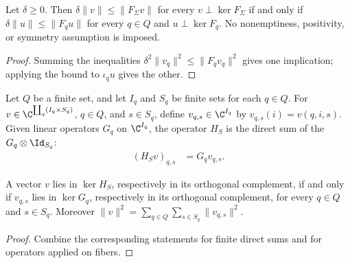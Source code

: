 \begin{lemma}
    \label{thm:mpo_sigma_fiber_gap_iff}
    \leanok
    Let $\delta\geq0$. Then $\delta\|v\|\leq\|F_\Sigma v\|$ for every
    $v\perp\ker F_\Sigma$ if and only if $\delta\|u\|\leq\|F_qu\|$ for every
    $q\in Q$ and $u\perp\ker F_q$. No nonemptiness, positivity, or symmetry
    assumption is imposed.
\end{lemma}
\begin{proof}
    \leanok
    Summing the inequalities $\delta^2\|v_q\|^2\leq\|F_qv_q\|^2$ gives one
    implication; applying the bound to $\iota_qu$ gives the other.
\end{proof}

\begin{definition}
    \label{def:mpo_dependent_spectator_operator}
    \leanok
    Let $Q$ be a finite set, and let $I_q$ and $S_q$ be finite sets for each
    $q\in Q$. For $v\in\C^{\coprod_q(I_q\times S_q)}$, $q\in Q$, and $s\in S_q$,
    define $v_{q,s}\in\C^{I_q}$ by $v_{q,s}(i)=v(q,i,s)$. Given linear
    operators $G_q$ on $\C^{I_q}$, the operator $H_S$ is the direct sum of the
    $G_q\otimes\Id_{S_q}$:
    \begin{align}
        (H_Sv)_{q,s} & =G_qv_{q,s}.
        \label{eq:mpo_dependent_spectator_action}
    \end{align}
\end{definition}

\begin{lemma}
    \label{thm:mpo_dependent_spectator_kernel}
    \leanok
    A vector $v$ lies in $\ker H_S$, respectively in its orthogonal complement,
    if and only if $v_{q,s}$ lies in $\ker G_q$, respectively in its orthogonal
    complement, for every $q\in Q$ and $s\in S_q$. Moreover
    $\|v\|^2=\sum_{q\in Q}\sum_{s\in S_q}\|v_{q,s}\|^2$.
\end{lemma}
\begin{proof}
    \leanok
    Combine the corresponding statements for finite direct sums and for
    operators applied on fibers.
\end{proof}

